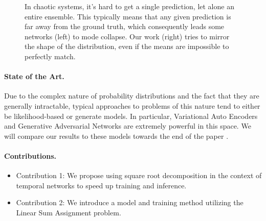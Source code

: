 \documentclass{article}
\begin{document}
\begin{figure}
    \centering
    \caption{
        In chaotic systems, it's hard to get a single prediction, let alone an entire ensemble. This typically means that any given prediction is far away from the ground truth, which consequently leads some networks (left) to mode collapse. Our work (right) tries to mirror the shape of the distribution, even if the means are impossible to perfectly match.
    }
    \label{separate_distributions}
\end{figure}

\paragraph{State of the Art.}
Due to the complex nature of probability distributions and the fact that they are generally intractable, typical approaches to problems of this nature tend to either be likelihood-based or generate models. In particular, Variational Auto Encoders and Generative Adversarial Networks are extremely powerful in this space. We will compare our results to these models towards the end of the paper \cite{goodfellow2014generative, kingma2022autoencoding, doersch2021tutorial}.

\paragraph{Contributions.}
\begin{itemize}
    \item Contribution 1: We propose using square root decomposition in the context of temporal networks to speed up training and inference.
    \item Contribution 2: We introduce a model and training method utilizing the Linear Sum Assignment problem.
\end{itemize}
\end{document}
